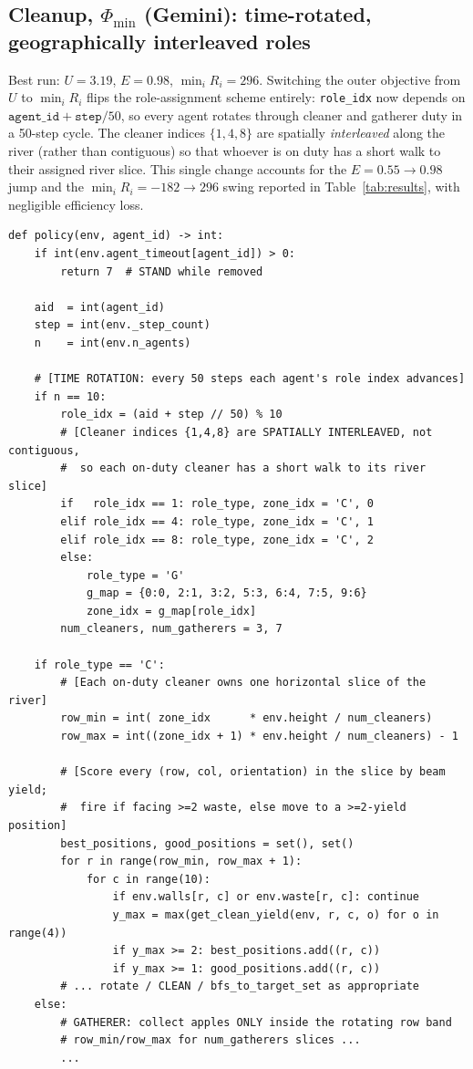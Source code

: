 \documentclass{article}
\begin{document}
\subsection{Cleanup, $\Phi_{\min}$ (Gemini): time-rotated, geographically interleaved roles}
\label{app:policy-min-gemini}

Best run: $U{=}3.19$, $E{=}0.98$, $\min_i R_i{=}296$. Switching the outer objective from $U$ to $\min_i R_i$ flips the role-assignment scheme entirely: \texttt{role\_idx} now depends on $\texttt{agent\_id} + \texttt{step}/{50}$, so every agent rotates through cleaner and gatherer duty in a 50-step cycle. The cleaner indices ${\{1,4,8\}}$ are spatially \emph{interleaved} along the river (rather than contiguous) so that whoever is on duty has a short walk to their assigned river slice. This single change accounts for the $E{=}0.55 \to 0.98$ jump and the $\min_i R_i {=} {-}182 \to 296$ swing reported in Table~\ref{tab:results}, with negligible efficiency loss.

\begin{lstlisting}[style=pythonpolicy, caption={Cleanup, $\Phi_{\min}$ -- Gemini 3.1 Pro. Time-rotated roles with interleaved geography (verbatim, abridged).}, label={lst:min-gemini}]
def policy(env, agent_id) -> int:
    if int(env.agent_timeout[agent_id]) > 0:
        return 7  # STAND while removed

    aid  = int(agent_id)
    step = int(env._step_count)
    n    = int(env.n_agents)

    # [TIME ROTATION: every 50 steps each agent's role index advances]
    if n == 10:
        role_idx = (aid + step // 50) % 10
        # [Cleaner indices {1,4,8} are SPATIALLY INTERLEAVED, not contiguous,
        #  so each on-duty cleaner has a short walk to its river slice]
        if   role_idx == 1: role_type, zone_idx = 'C', 0
        elif role_idx == 4: role_type, zone_idx = 'C', 1
        elif role_idx == 8: role_type, zone_idx = 'C', 2
        else:
            role_type = 'G'
            g_map = {0:0, 2:1, 3:2, 5:3, 6:4, 7:5, 9:6}
            zone_idx = g_map[role_idx]
        num_cleaners, num_gatherers = 3, 7

    if role_type == 'C':
        # [Each on-duty cleaner owns one horizontal slice of the river]
        row_min = int( zone_idx      * env.height / num_cleaners)
        row_max = int((zone_idx + 1) * env.height / num_cleaners) - 1

        # [Score every (row, col, orientation) in the slice by beam yield;
        #  fire if facing >=2 waste, else move to a >=2-yield position]
        best_positions, good_positions = set(), set()
        for r in range(row_min, row_max + 1):
            for c in range(10):
                if env.walls[r, c] or env.waste[r, c]: continue
                y_max = max(get_clean_yield(env, r, c, o) for o in range(4))
                if y_max >= 2: best_positions.add((r, c))
                if y_max >= 1: good_positions.add((r, c))
        # ... rotate / CLEAN / bfs_to_target_set as appropriate
    else:
        # GATHERER: collect apples ONLY inside the rotating row band
        # row_min/row_max for num_gatherers slices ...
        ...
\end{lstlisting}
\end{document}
